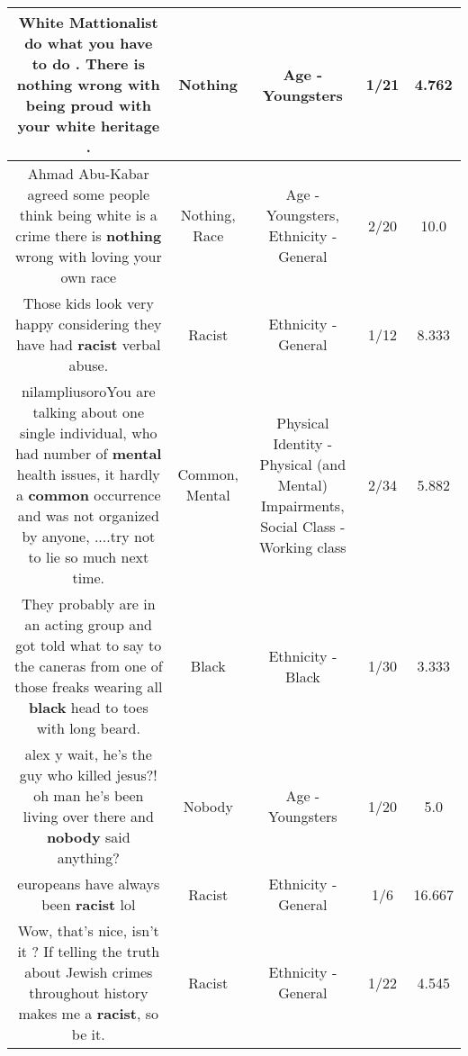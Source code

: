 \documentclass[11pt]{article}
\newlength\mylength
\begin{document}
\begin{center}
\begin{longtable}{|C{.65\mylength}|C{.30\mylength}|C{.12\mylength}|C{.12\mylength}|C{.12\mylength}|}
  \small White Mattionalist do what you have to do . There is \textbf{nothing} wrong with being proud with your white heritage .\normalsize   & Nothing & Age - Youngsters & 1/21 & 4.762 \\  \hline
  \small Ahmad Abu-Kabar agreed some people think being white is a crime there is \textbf{nothing} wrong with loving your own race\normalsize   & Nothing, Race & Age - Youngsters, Ethnicity - General & 2/20 & 10.0 \\  \hline
  \small Those kids look very happy considering they have had \textbf{racist} verbal abuse.\normalsize   & Racist & Ethnicity - General & 1/12 & 8.333 \\  \hline
  \small nilampliusoroYou are talking about one single individual, who had number of \textbf{mental} health issues, it hardly a \textbf{common}  occurrence and was not organized by anyone, ....try not to lie so much next time.\normalsize   & Common, Mental & Physical Identity - Physical (and Mental) Impairments, Social Class - Working class & 2/34 & 5.882 \\  \hline
  \small They probably are in an acting group and got told what to say to the caneras from one of those freaks wearing all \textbf{black} head to toes with long beard.\normalsize   & Black & Ethnicity - Black & 1/30 & 3.333 \\  \hline
  \small alex y wait, he's the guy who killed jesus?! oh man he's been living over there and \textbf{nobody} said anything?\normalsize   & Nobody & Age - Youngsters & 1/20 & 5.0 \\  \hline
  \small europeans have always been \textbf{racist} lol\normalsize   & Racist & Ethnicity - General & 1/6 & 16.667 \\  \hline
  \small Wow, that's nice, isn't it ? If telling the truth about Jewish crimes throughout history makes me a \textbf{racist}, so be it.\normalsize   & Racist & Ethnicity - General & 1/22 & 4.545 \\  \hline

\end{longtable}
\end{center}
\end{document}
